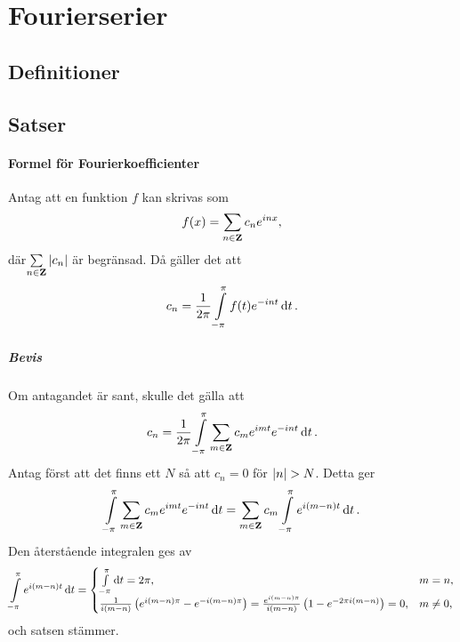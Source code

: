\section{Fourierserier}

\subsection{Definitioner}

\subsection{Satser}

\paragraph{Formel för Fourierkoefficienter}
Antag att en funktion $f$ kan skrivas som
\begin{align*}
	f(x) = \sum\limits_{n\in\mathbf{Z}}c_{n}e^{inx},
\end{align*}
där$\sum\limits_{n\in\mathbf{Z}}\abs{c_{n}}$ är begränsad. Då gäller det att
\begin{align*}
	c_{n} = \frac{1}{2\pi}\int\limits_{-\pi}^{\pi}f(t)e^{-int}\dd{t}.
\end{align*}

\subparagraph{Bevis}
Om antagandet är sant, skulle det gälla att
\begin{align*}
	c_{n} = \frac{1}{2\pi}\int\limits_{-\pi}^{\pi}\sum\limits_{m\in\mathbf{Z}}c_{m}e^{imt}e^{-int}\dd{t}.
\end{align*}
Antag först att det finns ett $N$ så att $c_{n} = 0$ för $\abs{n} > N$. Detta ger
\begin{align*}
	\int\limits_{-\pi}^{\pi}\sum\limits_{m\in\mathbf{Z}}c_{m}e^{imt}e^{-int}\dd{t} = \sum\limits_{m\in\mathbf{Z}}c_{m}\int\limits_{-\pi}^{\pi}e^{i(m - n)t}\dd{t}.
\end{align*}
Den återstående integralen ges av
\begin{align*}
	\int\limits_{-\pi}^{\pi}e^{i(m - n)t}\dd{t} =
	\begin{cases}
		\int\limits_{-\pi}^{\pi}\dd{t} = 2\pi,                                       &m = n, \\
		\frac{1}{i(m - n)}\left(e^{i(m - n)\pi} - e^{-i(m - n)\pi}\right) = \frac{e^{i(m - n)\pi}}{i(m - n)}\left(1 - e^{-2\pi i(m - n)}\right) = 0, &m\neq 0,
	\end{cases}
\end{align*}
och satsen stämmer.

